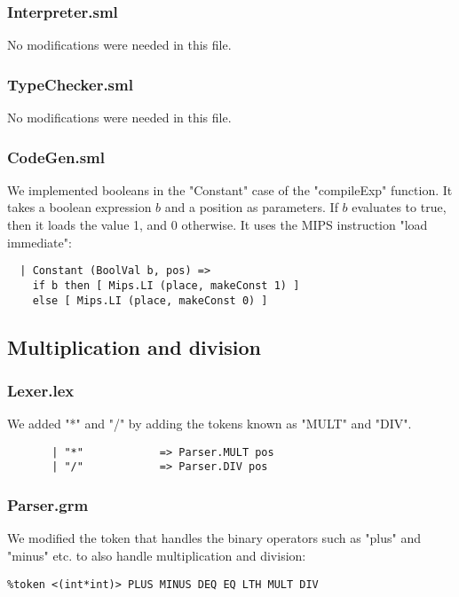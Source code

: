 \documentclass[12pt]{article}
\begin{document}
\subsubsection{Interpreter.sml}
No modifications were needed in this file. 
\subsubsection{TypeChecker.sml}
No modifications were needed in this file.
\subsubsection{CodeGen.sml}
We implemented booleans in the "Constant" case of the "compileExp" function. It takes a boolean expression \(b\) and a position as parameters. If \(b\) evaluates to true, then it loads the value 1, and 0 otherwise. It uses the MIPS instruction "load immediate": 
\begin{verbatim}
  | Constant (BoolVal b, pos) =>
    if b then [ Mips.LI (place, makeConst 1) ]
    else [ Mips.LI (place, makeConst 0) ]
\end{verbatim}
\subsection{Multiplication and division}
\subsubsection{Lexer.lex}
We added "*" and "/" by adding the tokens known as "MULT" and "DIV". 
\begin{verbatim}
       | "*"            => Parser.MULT pos
       | "/"            => Parser.DIV pos
\end{verbatim}
\subsubsection{Parser.grm}
We modified the token that handles the binary operators such as "plus" and "minus" etc. to also handle multiplication and division: 
\begin{verbatim}
%token <(int*int)> PLUS MINUS DEQ EQ LTH MULT DIV 
\end{verbatim}
\end{document}
